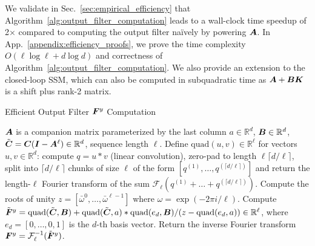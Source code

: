 We validate in 
Sec.~\ref{sec:empirical_efficiency} 
that Algorithm~\ref{alg:output_filter_computation} leads to a wall-clock time speedup of 2$\times$ compared to computing the output filter na\"ively by powering $\boldsymbol{A}$.
%
In App.\ \ref{appendix:efficiency_proofs}, we prove the time complexity $O(\ell \log \ell + d\log d)$ and correctness of Algorithm~\ref{alg:output_filter_computation}. We also provide an extension to the closed-loop SSM, which can also be computed in subquadratic time as $\boldsymbol{A}+\boldsymbol{B} \boldsymbol{K}$ is a shift plus rank-2 matrix. 

\begin{algorithm}[!t]
\caption{Efficient Output Filter $\boldsymbol{F}^y$ Computation}\label{alg:output_filter_computation}

\begin{algorithmic}[1]
\Require $\boldsymbol{A}$ is a companion matrix parameterized by the last column $a \in \mathbb{R}^d$, $\boldsymbol{B} \in \mathbb{R}^d$, $\tilde{\boldsymbol{C}} = \boldsymbol{C} (\boldsymbol{I} - \boldsymbol{A}^\ell) \in \mathbb{R}^d$, sequence length $\ell$.
\State Define $\mathrm{quad}(u, v) \in \mathbb{R}^\ell$ for vectors $u, v \in \mathbb{R}^d$: compute $q = u*v$ (linear convolution), zero-pad to length $\ell \lceil d / \ell \rceil$, split into $\lceil d/\ell \rceil$ chunks of size $\ell$ of the form $[q^{(1)}, \dots, q^{(\lceil d/\ell \rceil)}]$ and return the length-$\ell$ Fourier transform of the sum $\mathcal{F}_\ell(q^{(1)} + \dots + q^{(\lceil d/\ell \rceil)})$.
\State Compute the roots of unity $z = [\bar{\omega}^0, \dots, \bar{\omega}^{\ell-1}]$ where $\omega = \exp(-2\pi i / \ell)$.
\State Compute $\tilde{\boldsymbol{F}}^y = \mathrm{quad}(\tilde{\boldsymbol{C}}, \boldsymbol{B}) + \mathrm{quad}(\tilde{\boldsymbol{C}}, a) * \mathrm{quad}(e_d, \boldsymbol{B}) / (z - \mathrm{quad}(e_d, a)) \in \mathbb{R}^\ell$, where $e_d = [0, \dots, 0, 1]$ is the $d$-th basis vector. 
\State Return the inverse Fourier transform $\boldsymbol{F}^y = {\cal F}_\ell^{-1}(\tilde{\boldsymbol{F}}^y)$.
\end{algorithmic}
\end{algorithm}

%

%

